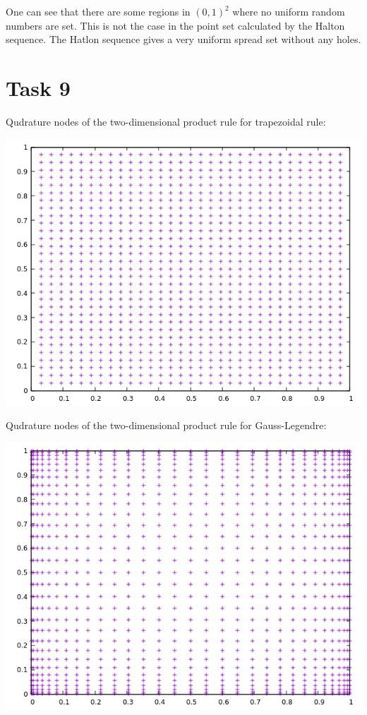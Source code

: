\documentclass[10pt,a4paper]{article}
\begin{document}
One can see that there are some regions in $(0,1)^2$ where no uniform random numbers are set. This is not the case in the point set calculated by the Halton sequence. The Hatlon sequence gives a very uniform spread set without any holes.

\section*{Task 9}

Qudrature nodes of the two-dimensional product rule for trapezoidal rule:
\begin{center}
\includegraphics[scale=0.5]{quadrature_nodes_trapezoidal_rule.png}		
\end{center}

Qudrature nodes of the two-dimensional product rule for Gauss-Legendre:
\begin{center}
\includegraphics[scale=0.5]{quadrature_nodes_gauss_legendre.png}		
\end{center}
\end{document}

